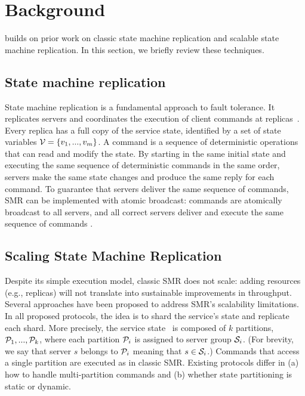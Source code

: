 \section{Background}
\label{sec:background}


\dynastar builds on prior work on classic state machine replication and scalable state machine replication.
In this section, we briefly review these techniques. 

\subsection{State machine replication}
\label{sec:smr}

State machine replication is a fundamental approach to fault tolerance.
It replicates servers and coordinates the execution of client commands at replicas~\cite{Lam78,Sch90}. 
Every replica has a full copy of the service state, identified by a set of state variables $\mathcal{V} = \{v_1, ..., v_m\}$.
A command is a sequence of deterministic operations that can read and modify the state.
By starting in the same initial state and executing the same sequence of deterministic commands in the same order, servers make the same state changes and produce the same reply for each command. 
To guarantee that servers deliver the same sequence of commands, SMR can be implemented with atomic broadcast: commands are atomically broadcast to all servers, and all correct servers deliver and execute the same sequence of commands \cite{BJ87b,DSU04}.


\subsection{Scaling State Machine Replication}

Despite its simple execution model, classic SMR does not scale: adding resources (e.g., replicas) will not translate into sustainable improvements in throughput. 
Several approaches have been proposed to address SMR's scalability limitations.
In all proposed protocols, the idea is to shard the service's state and replicate each shard.
More precisely, the service state \vvt\ is composed of $k$ partitions, $\mathcal{P}_1, ..., \mathcal{P}_k$, where each partition $\mathcal{P}_i$ is assigned to server group $\mathcal{S}_i$. 
(For brevity, we say that server $s$ belongs to $\mathcal{P}_i$ meaning that $s \in \mathcal{S}_i$.)
%
Commands that access a single partition are executed as in classic SMR.
Existing protocols differ in (a) how to handle multi-partition commands and (b) whether state partitioning is static or dynamic.

